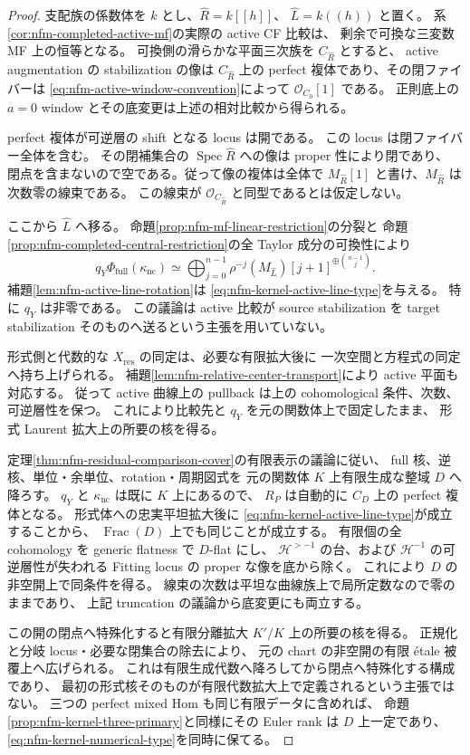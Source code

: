 \begin{proof}
支配族の係数体を $k$ とし、$\widehat R=k[[h]]$、
$\widehat L=k((h))$ と置く。
系\ref{cor:nfm-completed-active-mf}の実際の active CF 比較は、
剰余で可換な三変数 MF 上の恒等となる。
可換側の滑らかな平面三次族を $C_{\widehat R}$ とすると、
active augmentation の stabilization の像は
$C_{\widehat R}$ 上の perfect 複体であり、その閉ファイバーは
\eqref{eq:nfm-active-window-convention}によって
$\mathcal O_{C_0}[1]$ である。
正則底上の $a=0$ window とその底変更は上述の相対比較から得られる。

perfect 複体が可逆層の shift となる locus は開である。
この locus は閉ファイバー全体を含む。
その閉補集合の $\operatorname{Spec}\widehat R$ への像は proper 性により閉であり、
閉点を含まないので空である。従って像の複体は全体で
$M_{\widehat R}[1]$ と書け、$M_{\widehat R}$ は次数零の線束である。
この線束が $\mathcal O_{C_{\widehat R}}$ と同型であるとは仮定しない。

ここから $\widehat L$ へ移る。
命題\ref{prop:nfm-mf-linear-restriction}の分裂と
命題\ref{prop:nfm-completed-central-restriction}の全 Taylor 成分の可換性により
\[
 q_Y\Phi_{\mathrm{full}}(\kappa_{\mathrm{nc}})
 \simeq
 \bigoplus_{j=0}^{n-1}
 \rho^{-j}(M_{\widehat L})[j+1]^{\oplus\binom{n-1}j}.
\]
補題\ref{lem:nfm-active-line-rotation}は
\eqref{eq:nfm-kernel-active-line-type}を与える。
特に $q_Y$ は非零である。
この議論は active 比較が source stabilization を target stabilization
そのものへ送るという主張を用いていない。

形式側と代数的な $X_{\mathrm{res}}$ の同定は、必要な有限拡大後に
一次空間と方程式の同定へ持ち上げられる。
補題\ref{lem:nfm-relative-center-transport}により active 平面も対応する。
従って active 曲線上の pullback は上の cohomological 条件、次数、可逆層性を保つ。
これにより比較先と $q_Y$ を元の関数体上で固定したまま、
形式 Laurent 拡大上の所要の核を得る。

定理\ref{thm:nfm-residual-comparison-cover}の有限表示の議論に従い、
full 核、逆核、単位・余単位、rotation・周期図式を
元の関数体 $K$ 上有限生成な整域 $D$ へ降ろす。
$q_Y$ と $\kappa_{\mathrm{nc}}$ は既に $K$ 上にあるので、
$R_P$ は自動的に $C_D$ 上の perfect 複体となる。
形式体への忠実平坦拡大後に
\eqref{eq:nfm-kernel-active-line-type}が成立することから、
$\operatorname{Frac}(D)$ 上でも同じことが成立する。
有限個の全 cohomology を generic flatness で $D$-flat にし、
$\mathcal H^{>-1}$ の台、および $\mathcal H^{-1}$ の可逆層性が失われる
Fitting locus の proper な像を底から除く。
これにより $D$ の非空開上で同条件を得る。
線束の次数は平坦な曲線族上で局所定数なので零のままであり、
上記 truncation の議論から底変更にも両立する。

この開の閉点へ特殊化すると有限分離拡大 $K'/K$ 上の所要の核を得る。
正規化と分岐 locus・必要な閉集合の除去により、
元の chart の非空開の有限 étale 被覆上へ広げられる。
これは有限生成代数へ降ろしてから閉点へ特殊化する構成であり、
最初の形式核そのものが有限代数拡大上で定義されるという主張ではない。
三つの perfect mixed Hom も同じ有限データに含めれば、
命題\ref{prop:nfm-kernel-three-primary}と同様にその Euler rank は $D$ 上一定であり、
\eqref{eq:nfm-kernel-numerical-type}を同時に保てる。
\end{proof}

